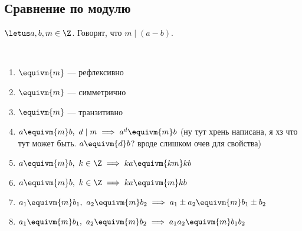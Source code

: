 \subsection{Сравнение по модулю}

\begin{defn}
    $\letus a, b, m \in \Z$. Говорят, что $m \mid (a - b)$.
\end{defn}

\begin{prop}~

    \begin{enumerate}
        \item $\equivm{m}$ --- рефлексивно
    
        \item $\equivm{m}$ --- симметрично
    
        \item $\equivm{m}$ --- транзитивно
    
        \item $a \equivm{m} b,~d \mid m \implies a^d \equivm{m} b$ (ну тут хрень написана, я хз что тут может быть. $a \equivm{d} b$? вроде слишком очев для свойства) 
    
        \item $a \equivm{m} b,~k \in \Z \implies ka \equivm{km} kb$
    
        \item $a \equivm{m} b,~k \in \Z \implies ka \equivm{m} kb$
    
        \item $a_1 \equivm{m} b_1,~a_2 \equivm{m} b_2 \implies a_1 \pm a_2 \equivm{m} b_1 \pm b_2$
    
        \item $a_1 \equivm{m} b_1,~a_2 \equivm{m} b_2 \implies a_1 a_2 \equivm{m} b_1 b_2$
    \end{enumerate}
\end{prop}